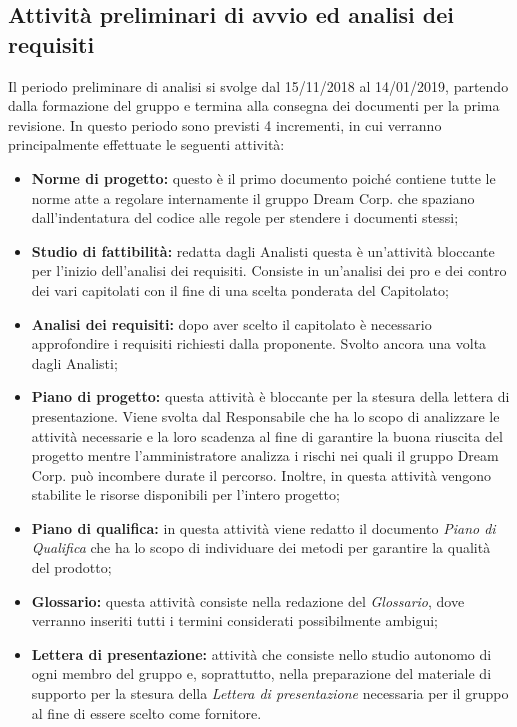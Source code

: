 \newpage
\subsection{Attività preliminari di avvio ed analisi dei requisiti}
Il periodo preliminare di analisi si svolge dal 15/11/2018 al 14/01/2019, partendo dalla formazione del gruppo e termina alla consegna dei documenti per la prima revisione. \newline
In questo periodo sono previsti 4 incrementi, in cui verranno principalmente effettuate le seguenti attività:
\begin{itemize}
	\item\textbf{Norme di progetto:} questo è il primo documento poiché contiene tutte le norme atte a regolare internamente il gruppo Dream Corp. che spaziano dall'indentatura del codice alle regole per stendere i documenti stessi;
	\item\textbf{Studio di fattibilità:} redatta dagli Analisti questa è un'attività bloccante per l'inizio dell'analisi dei requisiti. Consiste in un'analisi dei pro e dei contro dei vari capitolati con il fine di una scelta ponderata del Capitolato\pedice;
	\item\textbf{Analisi dei requisiti:} dopo aver scelto il capitolato è necessario approfondire i requisiti richiesti dalla proponente. Svolto ancora una volta dagli Analisti;
	\item\textbf{Piano di progetto:} questa attività è bloccante per la stesura della lettera di presentazione. Viene svolta dal Responsabile che ha lo scopo di analizzare le attività necessarie e la loro scadenza al fine di garantire la  buona riuscita del progetto mentre l'amministratore analizza i rischi nei quali il gruppo Dream Corp. può incombere durate il percorso. Inoltre, in questa attività vengono stabilite le risorse disponibili per l'intero progetto;
	\item\textbf{Piano di qualifica:} in questa attività viene redatto il documento \textit{Piano di Qualifica} che ha lo scopo di individuare dei metodi per garantire la qualità del prodotto;
	\item\textbf{Glossario:} questa attività consiste nella redazione del \textit{Glossario}, dove verranno inseriti tutti i termini considerati possibilmente ambigui;
	\item\textbf{Lettera di presentazione:} attività che consiste nello studio autonomo di ogni membro del gruppo e, soprattutto, nella preparazione del materiale di supporto per la stesura della \textit{Lettera di presentazione} necessaria per il gruppo al fine di essere scelto come fornitore.
\end{itemize}

